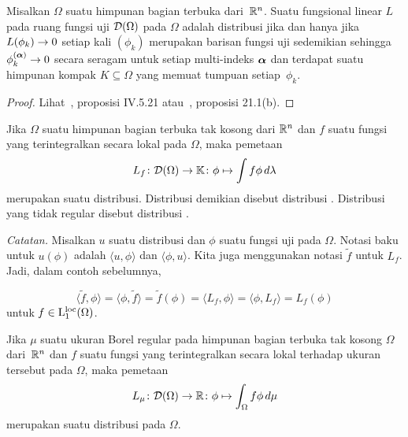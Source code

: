\begin{prop} Misalkan $\Omega$ suatu himpunan bagian terbuka dari~$\mathbb{R}^n$. Suatu fungsional linear $L$ pada ruang fungsi uji $\mathcal{D}(\Omega)$ pada $\Omega$ adalah
distribusi jika dan hanya jika $L(\phi_k) \rightarrow 0$ setiap kali $(\phi_k)$ merupakan barisan fungsi uji sedemikian sehingga $\phi_k^{(\boldsymbol{\alpha})} \rightarrow 0$
secara seragam untuk setiap multi-indeks $\boldsymbol{\alpha}$ dan terdapat suatu himpunan kompak $K \subseteq \Omega$ yang memuat tumpuan setiap~$\phi_k$.
\end{prop}

\begin{proof} Lihat~\cite{Conway:1990}, proposisi IV.5.21 atau~\cite{Treves:1967}, proposisi 21.1(b).  \ns
\end{proof}

\begin{exam} Jika $\Omega$ suatu himpunan bagian terbuka tak kosong dari $\mathbb{R}^n$ dan $f$ suatu fungsi yang terintegralkan secara lokal pada $\Omega$, maka pemetaan
   \[ L_f\colon \mathcal{D}(\Omega) \rightarrow \mathbb{K} \colon \phi \mapsto \int f\phi\,d\lambda \]
merupakan suatu distribusi. Distribusi demikian disebut
distribusi . Distribusi yang tidak regular disebut
distribusi .
\end{exam}

\emph{Catatan.} Misalkan $u$ suatu distribusi dan $\phi$ suatu fungsi uji pada $\Omega$. Notasi baku untuk $u(\phi)$ adalah
$\langle u,\phi \rangle$ dan $\langle \phi,u \rangle$. Kita juga menggunakan
notasi $\tilde f$ untuk $L_f$. Jadi, dalam contoh sebelumnya,

    \[ \langle \tilde f,\phi \rangle = \langle \phi,\tilde f \rangle
            = \tilde f(\phi) = \langle L_f,\phi \rangle
            = \langle \phi,L_f \rangle = L_f(\phi) \]
untuk $f \in \mathrm{L_1^{loc}}({\Omega})$.

\begin{exam} Jika $\mu$ suatu ukuran Borel regular pada himpunan bagian terbuka tak kosong $\Omega$ dari~$\mathbb{R}^n$ dan $f$ suatu fungsi yang terintegralkan secara lokal
terhadap ukuran tersebut pada $\Omega$, maka pemetaan
    \[ L_\mu\colon \mathcal{D}(\Omega) \rightarrow \mathbb{R}\colon \phi \mapsto \int_\Omega f\phi \,d\mu \]
merupakan suatu distribusi pada $\Omega$.
\end{exam}


